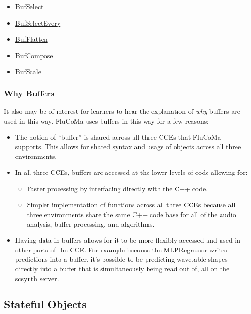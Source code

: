 \documentclass{article}
\providecommand{\tightlist}{%
  \setlength{\itemsep}{0pt}\setlength{\parskip}{0pt}}
\begin{document}
\begin{itemize}
\tightlist
\item
  \href{https://learn.flucoma.org/reference/bufselect/}{BufSelect}
\item
  \href{https://learn.flucoma.org/reference/bufselectevery/}{BufSelectEvery}
\item
  \href{https://learn.flucoma.org/reference/bufflatten/}{BufFlatten}
\item
  \href{https://learn.flucoma.org/reference/bufcompose/}{BufCompose}
\item
  \href{https://learn.flucoma.org/reference/bufscale/}{BufScale}
\end{itemize}

\subsubsection{Why Buffers}

It also may be of interest for learners to hear the explanation of
\emph{why} buffers are used in this way. FluCoMa uses buffers in this
way for a few reasons:

\begin{itemize}
\tightlist
\item
  The notion of ``buffer'' is shared across all three CCEs that FluCoMa
  supports. This allows for shared syntax and usage of objects across
  all three environments.
\item
  In all three CCEs, buffers are accessed at the lower levels of code
  allowing for:

  \begin{itemize}
  \tightlist
  \item
    Faster processing by interfacing directly with the C++ code.
  \item
    Simpler implementation of functions across all three CCEs because
    all three environments share the same C++ code base for all of the
    audio analysis, buffer processing, and algorithms.
  \end{itemize}
\item
  Having data in buffers allows for it to be more flexibly accessed and
  used in other parts of the CCE. For example because the MLPRegressor
  writes predictions into a buffer, it's possible to be predicting
  wavetable shapes directly into a
  buffer that is simultaneously being read out of, all on the scsynth server.
\end{itemize}

\subsection{Stateful Objects}\label{stateful-objects}
\end{document}
